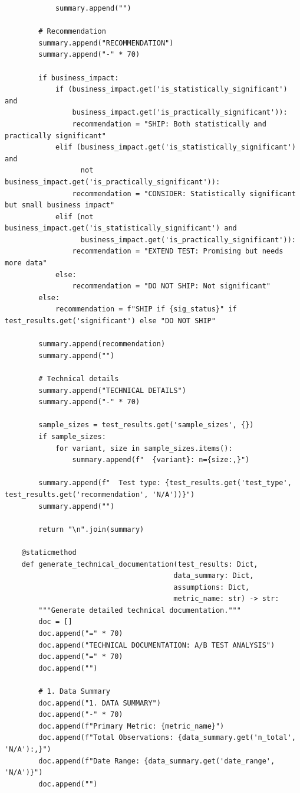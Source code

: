 \begin{lstlisting}
            summary.append("")

        # Recommendation
        summary.append("RECOMMENDATION")
        summary.append("-" * 70)

        if business_impact:
            if (business_impact.get('is_statistically_significant') and
                business_impact.get('is_practically_significant')):
                recommendation = "SHIP: Both statistically and practically significant"
            elif (business_impact.get('is_statistically_significant') and
                  not business_impact.get('is_practically_significant')):
                recommendation = "CONSIDER: Statistically significant but small business impact"
            elif (not business_impact.get('is_statistically_significant') and
                  business_impact.get('is_practically_significant')):
                recommendation = "EXTEND TEST: Promising but needs more data"
            else:
                recommendation = "DO NOT SHIP: Not significant"
        else:
            recommendation = f"SHIP if {sig_status}" if test_results.get('significant') else "DO NOT SHIP"

        summary.append(recommendation)
        summary.append("")

        # Technical details
        summary.append("TECHNICAL DETAILS")
        summary.append("-" * 70)

        sample_sizes = test_results.get('sample_sizes', {})
        if sample_sizes:
            for variant, size in sample_sizes.items():
                summary.append(f"  {variant}: n={size:,}")

        summary.append(f"  Test type: {test_results.get('test_type', test_results.get('recommendation', 'N/A'))}")
        summary.append("")

        return "\n".join(summary)

    @staticmethod
    def generate_technical_documentation(test_results: Dict,
                                        data_summary: Dict,
                                        assumptions: Dict,
                                        metric_name: str) -> str:
        """Generate detailed technical documentation."""
        doc = []
        doc.append("=" * 70)
        doc.append("TECHNICAL DOCUMENTATION: A/B TEST ANALYSIS")
        doc.append("=" * 70)
        doc.append("")

        # 1. Data Summary
        doc.append("1. DATA SUMMARY")
        doc.append("-" * 70)
        doc.append(f"Primary Metric: {metric_name}")
        doc.append(f"Total Observations: {data_summary.get('n_total', 'N/A'):,}")
        doc.append(f"Date Range: {data_summary.get('date_range', 'N/A')}")
        doc.append("")


\end{lstlisting}
